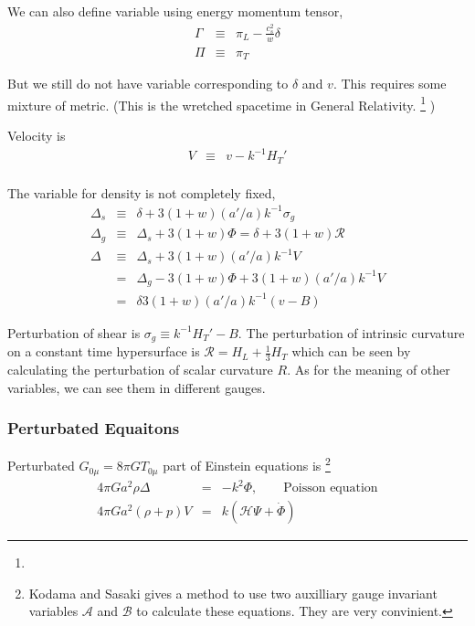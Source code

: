 \documentclass[12pt,a4paper]{book}
\begin{document}
We can also define variable using energy momentum tensor,
\begin{eqnarray}
	\Gamma &\equiv & \pi_L - \frac{c_s^2}{w} \delta \\
	\Pi & \equiv & \pi_T
\end{eqnarray}

But we still do not have variable corresponding to $\delta$ and $v$. This requires some mixture of metric. (This is the wretched spacetime in General Relativity. \footnote{\color{red}{Need more information for this point.}} )

Velocity is
\begin{eqnarray}
	V &\equiv & v - k^{-1} H_T' \\
\end{eqnarray}

The variable for density is not completely fixed,
\begin{eqnarray}
	\Delta_s&\equiv & \delta + 3 (1+w)(a'/a)k^{-1} \sigma_g \\
	\Delta_g &\equiv & \Delta_s + 3 (1+w) \Phi = \delta + 3(1+w)\mathcal R \\
	\Delta &\equiv & \Delta_s  + 3(1+w)(a'/a) k^{-1} V \\
	&=& \Delta_g - 3(1+w)\Phi + 3(1+w)(a'/a)k^{-1}V \\
	&=& \delta 3(1+w) (a'/a)k^{-1}(v-B)
\end{eqnarray}

Perturbation of shear is $\sigma_g\equiv k^{-1} H_T' - B$. The perturbation of intrinsic curvature on a constant time hypersurface is $\mathcal R = H_L + \frac13 H_T$ which can be seen by calculating the perturbation of scalar curvature $R$. As for the meaning of other variables, we can see them in different gauges.



\subsubsection{Perturbated Equaitons}

Perturbated $G_{0\mu} = 8\pi G T_{0\mu}$ part of Einstein equations is \footnote{Kodama and Sasaki gives a method to use two auxilliary gauge invariant variables $\mathcal A$ and $\mathcal B$ to calculate these equations. They are very convinient.}
\begin{eqnarray}
	4\pi G a^2 \rho \Delta &=& - k^2 \Phi, \qquad\text{Poisson equation}\\
	4\pi G a^2 (\rho + p ) V &=& k(\mathcal H \Psi + \dot\Phi)
\end{eqnarray}
\end{document}
